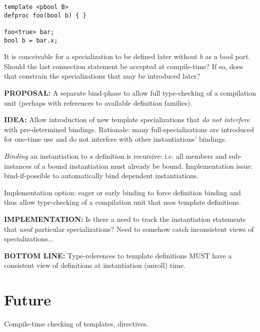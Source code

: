 \begin{verbatim}
template <pbool B>
defproc foo(bool b) { }

foo<true> bar;
bool b = bar.x;
\end{verbatim}

It is conceivable for a specialization to be defined later without
$b$ as a bool port.  
Should the last connection statement be accepted at compile-time?
If so, does that constrain the specializations that may be introduced later?


\textbf{PROPOSAL:}
A separate bind-phase to allow full type-checking of a compilation unit
(perhaps with references to available definition families).  

\textbf{IDEA:}
Allow introduction of new template specializations that
\emph{do not interfere} with pre-determined bindings.  
Rationale: many full-specializations are introduced for one-time use and
do not interfere with other instantiations' bindings.  

\emph{Binding} an instantiation to a definition is recursive: i.e.
all members and sub-instances of a bound instantiation must already be bound.  
Implementation issue: bind-if-possible to automatically bind dependent
instantiations.  

Implementation option: eager or early binding to force 
definition binding and thus allow type-checking of a 
compilation unit that uses template definitions.  

\textbf{IMPLEMENTATION:}
Is there a need to track the instantiation statements that \emph{used}
particular specializations?  Need to somehow catch inconsistent views
of specializations...

\textbf{BOTTOM LINE:}
Type-references to template definitions MUST have a consistent
view of definitions at instantiation (unroll) time.  

\section{Future}
\label{sec:templates:future}

Compile-time checking of templates, directives.  


